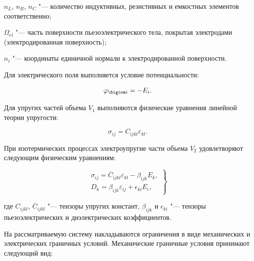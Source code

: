 $n_{L}$, $n_{R}$, $n_{C}$ "--- количество индуктивных, резистивных и емкостных элементов соответственно;

$\Omega_{el}$ "--- часть поверхности пьезоэлектрического тела, покрытая электродами (электродированная поверхность);

$n_{i}$ "--- координаты единичной нормали к электродированной поверхности.

Для электрического поля выполняется условие потенциальности:

\begin{equation}\label{mult:eq2}

\varphi_{\bigcom i}=-E_{i}.

\end{equation}



Для упругих частей объема $V_{1}$ выполняются физические уравнения линейной теории упругости:

\begin{equation}\label{mult:eq3}

\sigma_{ij}=C_{ijkl}\varepsilon_{kl}.

\end{equation}



При изотермических процессах электроупругие части объема $V_{2}$ удовлетворяют следующим физическим уравнениям:

\begin{equation}\label{mult:eq4}

\left.

\begin{array}{l}

\sigma_{ij}=\overline{C}_{ijkl}\varepsilon_{kl}-\beta_{ijk}{E_{k}}, \\

D_{k}=\beta_{ijk}\varepsilon_{ij}+\epsilon_{ki}E_{i},

\end{array}

\right\}

\end{equation}

где $C_{ijkl}$, ${\overline{C}}_{ijkl}$ "--- тензоры упругих констант, $\beta_{ijk}$ и $\epsilon_{ki}$ "--- тензоры пьезоэлектрических и диэлектрических коэффициентов.



На рассматриваемую систему накладываются ограничения в виде механических и электрических граничных условий. Механические граничные условия принимают следующий вид:

